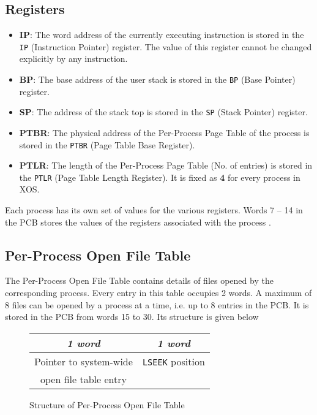 \documentclass[10pt]{report}
\begin{document}
	  \subsection{Registers}
	  \label{sec:registers} 
\begin{itemize}
	\item \textbf{IP}: The word address of the currently executing instruction is stored in the \texttt{IP} (Instruction Pointer) register. The value of this register cannot be changed explicitly by any instruction. 
	
	\item \textbf{BP}:   The base address of the user stack is stored in the \texttt{BP} (Base Pointer) register. 
	\item \textbf{SP}: The address of the stack top is stored in the \texttt{SP} (Stack Pointer) register. 
	\item \textbf{PTBR}: The physical address of the Per-Process Page Table of the process is stored in the \texttt{PTBR} (Page Table Base Register).
	\item  \textbf{PTLR}: The length of the Per-Process Page Table (No. of entries) is stored in the \texttt{PTLR} (Page Table Length Register). It is fixed as \textbf{4} for every process in XOS. 
	
\end{itemize}
Each process has its own set of values for the various registers. Words  7 -- 14 in the PCB stores the values of the registers associated with the process .
	
	
\subsection{Per-Process Open File Table} 
\label{sec:processfile table}
	 
	  The Per-Process Open File Table contains details of files opened by the corresponding process. Every entry in this table occupies 2 words. A maximum of 8 files can be opened by a process at a time, i.e. up to 8 entries in the PCB. It is stored in the PCB from words 15 to 30. Its structure is given below


		\begin{figure}[htp!]
		\centering
		\begin{tabular}{|c|c|}
			\textit{1 word} & \textit{1 word} \\
			\hline
			Pointer to system-wide & \texttt{LSEEK} position\\ open file table entry &  \\
			\hline
		\end{tabular}
		\caption{Structure of Per-Process Open File Table}
		\label{fig:processfile table}
	\end{figure}
	
\end{document}
